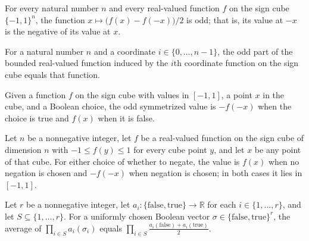 \begin{theorem}
\label{FABL.odd_oddPart}
\leanok
{}
For every natural number $n$ and every real-valued function $f$ on the sign cube
$\{-1,1\}^n$, the function $x\mapsto \bigl(f(x)-f(-x)\bigr)/2$ is odd; that is, its
value at $-x$ is the negative of its value at $x$.
\end{theorem}

\begin{theorem}
\label{FABL.BoundedCubeFunction.oddPart_ofBoolean_dictator}
\leanok
{}
For a natural number $n$ and a coordinate $i\in\{0,\ldots,n-1\}$, the odd part of
the bounded real-valued function induced by the $i$th coordinate function on the sign
cube equals that function.
\end{theorem}

\begin{definition}
\label{FABL.oddSymmetrizedMean}
\leanok
{}
Given a function $f$ on the sign cube with values in $[-1,1]$, a point $x$ in the cube,
and a Boolean choice, the odd symmetrized value is $-f(-x)$ when the choice is true and
$f(x)$ when it is false.
\end{definition}

\begin{theorem}
\label{FABL.oddSymmetrizedMean_mem_Icc}
\leanok
{}
Let $n$ be a nonnegative integer, let $f$ be a real-valued function on the sign cube of
dimension $n$ with $-1\le f(y)\le 1$ for every cube point $y$, and let $x$ be any point
of that cube. For either choice of whether to negate, the value is $f(x)$ when no
negation is chosen and $-f(-x)$ when negation is chosen; in both cases it lies in
$[-1,1]$.
\end{theorem}

\begin{theorem}
\label{FABL.expect_boolChoices_prod}
\leanok
{}
Let $r$ be a nonnegative integer, let
$a_i:\{\mathrm{false},\mathrm{true}\}\to\mathbb{R}$ for each $i\in\{1,\ldots,r\}$, and
let $S\subseteq\{1,\ldots,r\}$. For a uniformly chosen Boolean vector
$\sigma\in\{\mathrm{false},\mathrm{true}\}^r$, the average of $\prod_{i\in
S}a_i(\sigma_i)$ equals $\prod_{i\in
S}\frac{a_i(\mathrm{false})+a_i(\mathrm{true})}{2}$.
\end{theorem}


